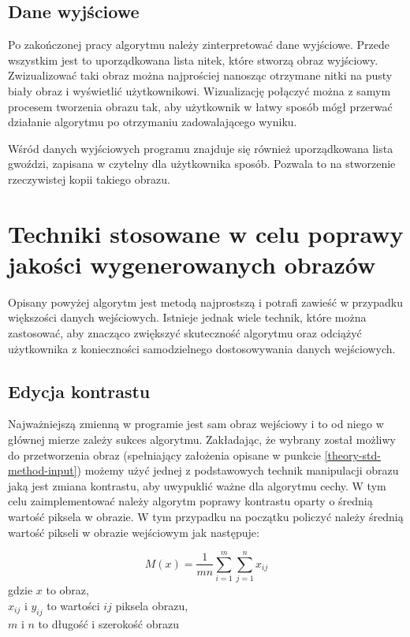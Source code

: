         \subsection{Dane wyjściowe} \label{theory-std-method-output}
        Po zakończonej pracy algorytmu należy zinterpretować dane wyjściowe. Przede wszystkim jest to uporządkowana lista nitek, które stworzą obraz wyjściowy. Zwizualizować taki obraz można najprościej nanosząc otrzymane nitki na pusty biały obraz i wyświetlić użytkownikowi. Wizualizację połączyć można z samym procesem tworzenia obrazu tak, aby użytkownik w łatwy sposób mógł przerwać działanie algorytmu po otrzymaniu zadowalającego wyniku.
        
        Wśród danych wyjściowych programu znajduje się również uporządkowana lista gwoździ, zapisana w czytelny dla użytkownika sposób. Pozwala to na stworzenie rzeczywistej kopii takiego obrazu.
        
    \section{Techniki stosowane w celu poprawy jakości wygenerowanych obrazów} \label{theory-technics}
    Opisany powyżej algorytm jest metodą najprostszą i potrafi zawieść w przypadku większości danych wejściowych. Istnieje jednak wiele technik, które można zastosować, aby znacząco zwiększyć skuteczność algorytmu oraz odciążyć użytkownika z konieczności samodzielnego dostosowywania danych wejściowych.
        \subsection{Edycja kontrastu} \label{theory-technics-contrast}
        Najważniejszą zmienną w programie jest sam obraz wejściowy i to od niego w głównej mierze zależy sukces algorytmu. Zakładając, że wybrany został możliwy do przetworzenia obraz (spełniający założenia opisane w punkcie \ref{theory-std-method-input}) możemy użyć jednej z podstawowych technik manipulacji obrazu jaką jest zmiana kontrastu, aby uwypuklić ważne dla algorytmu cechy. W tym celu zaimplementować należy algorytm poprawy kontrastu oparty o średnią wartość piksela w obrazie. W tym przypadku na początku policzyć należy średnią wartość pikseli w obrazie wejściowym jak następuje:
        
        \begin{equation} \label{theory-technics-contrast-mean}
            M(x) = \frac{1}{mn} \sum_{i=1}^m \sum_{j=1}^n x_{ij}
        \end{equation}
        gdzie \(x\) to obraz,\\
        \(x_{ij}\) i \(y_{ij}\) to wartości \(ij\) piksela obrazu,\\
        \(m\) i \(n\) to długość i szerokość obrazu
        
